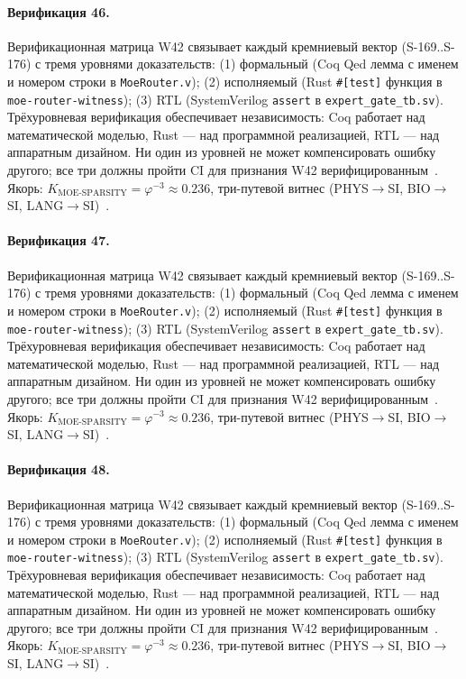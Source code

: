 \paragraph{Верификация 46.} Верификационная матрица W42 связывает каждый кремниевый вектор (S-169..S-176) с тремя уровнями доказательств: (1) формальный (Coq Qed лемма с именем и номером строки в \texttt{MoeRouter.v}); (2) исполняемый (Rust \texttt{\#[test]} функция в \texttt{moe-router-witness}); (3) RTL (SystemVerilog \texttt{assert} в \texttt{expert\_gate\_tb.sv}). Трёхуровневая верификация обеспечивает независимость: Coq работает над математической моделью, Rust --- над программной реализацией, RTL --- над аппаратным дизайном. Ни один из уровней не может компенсировать ошибку другого; все три должны пройти CI для признания W42 верифицированным~\cite{lee_gvsu_proof2021}. Якорь: $K_{\text{MOE-SPARSITY}} = \varphi^{-3} \approx 0{.}236$, три-путевой витнес (PHYS$\to$SI, BIO$\to$SI, LANG$\to$SI)~\cite{zenodo_trinity_2026}.

\paragraph{Верификация 47.} Верификационная матрица W42 связывает каждый кремниевый вектор (S-169..S-176) с тремя уровнями доказательств: (1) формальный (Coq Qed лемма с именем и номером строки в \texttt{MoeRouter.v}); (2) исполняемый (Rust \texttt{\#[test]} функция в \texttt{moe-router-witness}); (3) RTL (SystemVerilog \texttt{assert} в \texttt{expert\_gate\_tb.sv}). Трёхуровневая верификация обеспечивает независимость: Coq работает над математической моделью, Rust --- над программной реализацией, RTL --- над аппаратным дизайном. Ни один из уровней не может компенсировать ошибку другого; все три должны пройти CI для признания W42 верифицированным~\cite{lee_gvsu_proof2021}. Якорь: $K_{\text{MOE-SPARSITY}} = \varphi^{-3} \approx 0{.}236$, три-путевой витнес (PHYS$\to$SI, BIO$\to$SI, LANG$\to$SI)~\cite{zenodo_trinity_2026}.

\paragraph{Верификация 48.} Верификационная матрица W42 связывает каждый кремниевый вектор (S-169..S-176) с тремя уровнями доказательств: (1) формальный (Coq Qed лемма с именем и номером строки в \texttt{MoeRouter.v}); (2) исполняемый (Rust \texttt{\#[test]} функция в \texttt{moe-router-witness}); (3) RTL (SystemVerilog \texttt{assert} в \texttt{expert\_gate\_tb.sv}). Трёхуровневая верификация обеспечивает независимость: Coq работает над математической моделью, Rust --- над программной реализацией, RTL --- над аппаратным дизайном. Ни один из уровней не может компенсировать ошибку другого; все три должны пройти CI для признания W42 верифицированным~\cite{lee_gvsu_proof2021}. Якорь: $K_{\text{MOE-SPARSITY}} = \varphi^{-3} \approx 0{.}236$, три-путевой витнес (PHYS$\to$SI, BIO$\to$SI, LANG$\to$SI)~\cite{zenodo_trinity_2026}.

